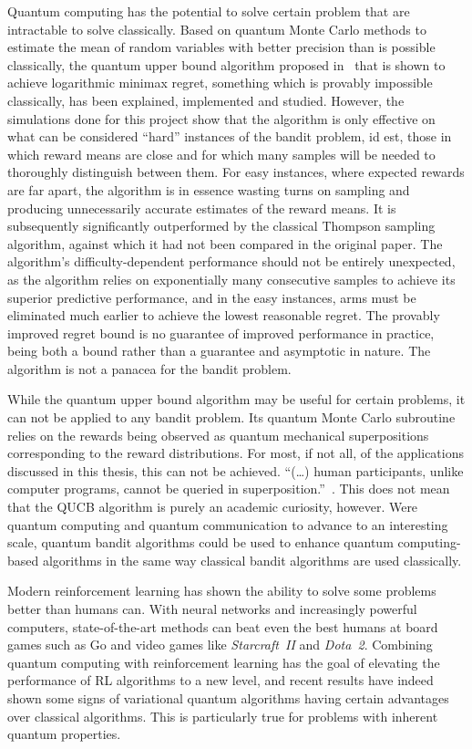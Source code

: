 Quantum computing has the potential to solve certain problem that are intractable to solve classically.
Based on quantum Monte Carlo methods to estimate the mean of random variables with better precision than is possible classically, the quantum upper bound algorithm proposed in~\autocite{wan2022} that is shown to achieve logarithmic minimax regret, something which is provably impossible classically, has been explained, implemented and studied.
However, the simulations done for this project show that the algorithm is only effective on what can be considered \enquote{hard} instances of the bandit problem, id est, those in which reward means are close and for which many samples will be needed to thoroughly distinguish between them.
For easy instances, where expected rewards are far apart, the algorithm is in essence wasting turns on sampling and producing unnecessarily accurate estimates of the reward means.
It is subsequently significantly outperformed by the classical Thompson sampling algorithm, against which it had not been compared in the original paper.
The algorithm's difficulty-dependent performance should not be entirely unexpected, as the algorithm relies on exponentially many consecutive samples to achieve its superior predictive performance, and in the easy instances, arms must be eliminated much earlier to achieve the lowest reasonable regret.
The provably improved regret bound is no guarantee of improved performance in practice, being both a bound rather than a guarantee and asymptotic in nature.
The algorithm is not a panacea for the bandit problem.

While the quantum upper bound algorithm may be useful for certain problems, it can not be applied to any bandit problem.
Its quantum Monte Carlo subroutine relies on the rewards being observed as quantum mechanical superpositions corresponding to the reward distributions.
For most, if not all, of the applications discussed in this thesis, this can not be achieved.
\enquote{(\dots) human participants, unlike computer programs, cannot be queried in superposition.}~\autocite{wang2021}.
This does not mean that the QUCB algorithm is purely an academic curiosity, however.
Were quantum computing and quantum communication to advance to an interesting scale, quantum bandit algorithms could be used to enhance quantum computing-based algorithms in the same way classical bandit algorithms are used classically.

Modern reinforcement learning has shown the ability to solve some problems better than humans can.
With neural networks and increasingly powerful computers, state-of-the-art methods can beat even the best humans at board games such as Go and video games like \textit{Starcraft~II} and \textit{Dota~2}.
Combining quantum computing with reinforcement learning has the goal of elevating the performance of RL algorithms to a new level, and recent results have indeed shown some signs of variational quantum algorithms having certain advantages over classical algorithms.
This is particularly true for problems with inherent quantum properties.

